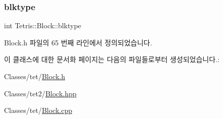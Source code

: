 \mbox{\label{class_tetris_1_1_block_aceac58dcf8d8afaa82c2bab101cb3cff}} 
\subsubsection{\texorpdfstring{blktype}{blktype}}
{\footnotesize\ttfamily int Tetris\+::\+Block\+::blktype\hspace{0.3cm}{\ttfamily [private]}}



Block.\+h 파일의 65 번째 라인에서 정의되었습니다.



이 클래스에 대한 문서화 페이지는 다음의 파일들로부터 생성되었습니다.\+:\begin{DoxyCompactItemize}
\item 
Classes/tet/\hyperlink{_block_8h}{Block.\+h}\item 
Classes/tet2/\hyperlink{_block_8hpp}{Block.\+hpp}\item 
Classes/tet/\hyperlink{_block_8cpp}{Block.\+cpp}\end{DoxyCompactItemize}

